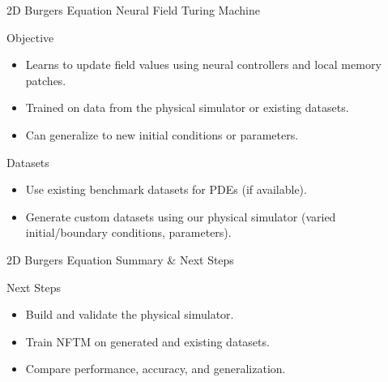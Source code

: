 \begin{frame}{2D Burgers Equation}
\small
\textcolor{red_unipd}{\Large Neural Field Turing Machine}

\vspace{0.6em}

\begin{alertblock}{Objective}
\begin{itemize}
  \item Learns to update field values using neural controllers and local memory patches.
  \item Trained on data from the physical simulator or existing datasets.
  \item Can generalize to new initial conditions or parameters.
\end{itemize}
\end{alertblock}

\begin{block}{Datasets}
\begin{itemize}
  \item Use existing benchmark datasets for PDEs (if available).
  \item Generate custom datasets using our physical simulator (varied initial/boundary conditions, parameters).
\end{itemize}
\end{block}
\end{frame}


\begin{frame}{2D Burgers Equation}
\small
\textcolor{red_unipd}{\Large Summary \& Next Steps}

\vspace{0.6em}

\begin{block}{Next Steps}
\begin{itemize}
  \item Build and validate the physical simulator.
  \item Train NFTM on generated and existing datasets.
  \item Compare performance, accuracy, and generalization.
\end{itemize}
\end{block}
\end{frame}